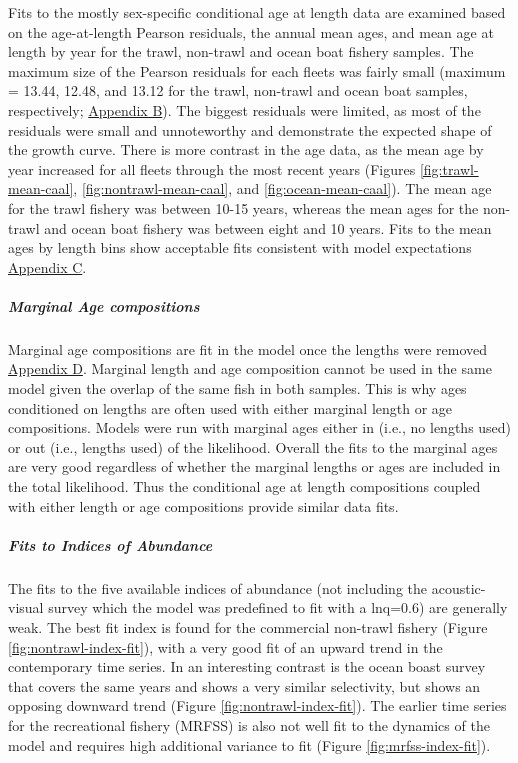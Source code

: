 \documentclass[11pt,
  english,
  letterpaper,
]{article}
\begin{document}
Fits to the mostly sex-specific conditional age at length data are examined based on the age-at-length Pearson residuals, the annual mean ages, and mean age at length by year for the trawl, non-trawl and ocean boat fishery samples. The maximum size of the Pearson residuals for each fleets was fairly small (maximum = 13.44, 12.48, and 13.12 for the trawl, non-trawl and ocean boat samples, respectively; \protect\hyperlink{app_b}{Appendix B}). The biggest residuals were limited, as most of the residuals were small and unnoteworthy and demonstrate the expected shape of the growth curve. There is more contrast in the age data, as the mean age by year increased for all fleets through the most recent years (Figures \ref{fig:trawl-mean-caal}, \ref{fig:nontrawl-mean-caal}, and \ref{fig:ocean-mean-caal}). The mean age for the trawl fishery was between 10-15 years, whereas the mean ages for the non-trawl and ocean boat fishery was between eight and 10 years. Fits to the mean ages by length bins show acceptable fits consistent with model expectations \protect\hyperlink{app_c}{Appendix C}.

\hypertarget{marginal-age-compositions}{%
\subparagraph{Marginal Age compositions}\label{marginal-age-compositions}}

Marginal age compositions are fit in the model once the lengths were removed \protect\hyperlink{app_d}{Appendix D}. Marginal length and age composition cannot be used in the same model given the overlap of the same fish in both samples. This is why ages conditioned on lengths are often used with either marginal length or age compositions. Models were run with marginal ages either in (i.e., no lengths used) or out (i.e., lengths used) of the likelihood. Overall the fits to the marginal ages are very good regardless of whether the marginal lengths or ages are included in the total likelihood. Thus the conditional age at length compositions coupled with either length or age compositions provide similar data fits.

\hypertarget{fits-to-indices-of-abundance}{%
\subparagraph{Fits to Indices of Abundance}\label{fits-to-indices-of-abundance}}

The fits to the five available indices of abundance (not including the acoustic-visual survey which the model was predefined to fit with a lnq=0.6) are generally weak. The best fit index is found for the commercial non-trawl fishery (Figure \ref{fig:nontrawl-index-fit}), with a very good fit of an upward trend in the contemporary time series. In an interesting contrast is the ocean boast survey that covers the same years and shows a very similar selectivity, but shows an opposing downward trend (Figure \ref{fig:nontrawl-index-fit}). The earlier time series for the recreational fishery (MRFSS) is also not well fit to the dynamics of the model and requires high additional variance to fit (Figure \ref{fig:mrfss-index-fit}).
\end{document}
